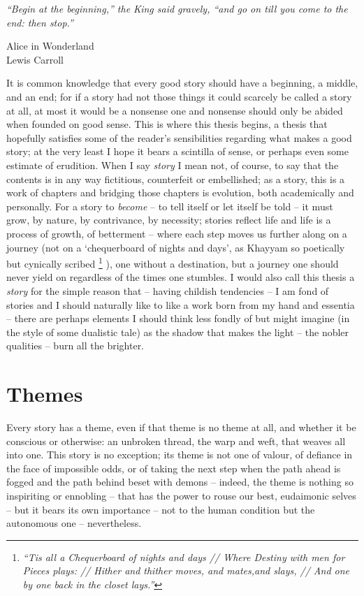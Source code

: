 \epigraph{
    \emph{
        ``Begin at the beginning,'' the King said gravely, ``and go on till you come to the end:
        then stop.''
} 
%
}
{Alice in Wonderland\\Lewis Carroll}
%
\noindent It is common knowledge that every good story should have a beginning, a middle, and an
end; for if a story had not those things it could scarcely be called a story at all, at most it
would be a nonsense one and nonsense should only be abided when founded on good sense.
%
This is where this thesis begins, a thesis that hopefully satisfies some of the reader's
sensibilities regarding what makes a good story; at the very least I hope it bears a scintilla of
sense, or perhaps even some estimate of erudition.
%
When I say \emph{story} I mean not, of course, to say that the contents is in any way
fictitious, counterfeit or embellished; as a story, this is a work of chapters and
bridging those chapters is evolution, both academically and personally.
%
For a story to \emph{become} -- to tell itself or let itself be told -- it must grow, by nature, by
contrivance, by necessity; stories reflect life and life is a process of growth, of betterment --
where each step moves us further along on a journey (not on a `chequerboard of nights and days', as
Khayyam so poetically but cynically scribed
%
\footnote{
    \emph{
        “Tis all a Chequerboard of nights and days //
        Where Destiny with men for Pieces plays: //
        Hither and thither moves, and mates,and slays, //
        And one by one back in the closet lays.”
    }
}
%
), one without a destination, but a journey one should
never yield on regardless of the times one stumbles.
%
I would also call this thesis a \emph{story} for the simple reason that -- having childish
tendencies -- I am fond of stories and I should naturally like to like a work born from my hand and
essentia -- there are perhaps elements I should think less fondly of but might imagine (in the
style of some dualistic tale) as the shadow that makes the light -- the nobler qualities -- burn
all the brighter.

\section{Themes}
%
Every story has a theme, even if that theme is no theme at all, and whether it be conscious or
otherwise: an unbroken thread, the warp and weft, that weaves all into one.
%
This story is no exception; its theme is not one of valour, of defiance in the face of impossible
odds, or of taking the next step when the path ahead is fogged and the path behind beset with
demons -- indeed, the theme is nothing so inspiriting or ennobling -- that has the power to rouse
our best, eudaimonic selves -- but it bears its own importance -- not to the human condition but
the autonomous one -- nevertheless.





